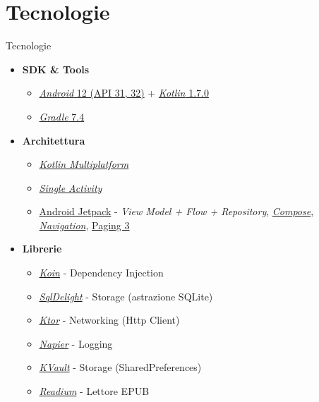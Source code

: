 \documentclass[10pt]{beamer}
\begin{document}
\section{Tecnologie}
\begin{frame}{Tecnologie}
    \begin{itemize}
    \item \textbf{SDK \& Tools}
    \begin{itemize}
        \item \href{https://developer.android.com/about/versions/12}{\textit{Android} 12 (API 31, 32)} + \href{https://github.com/JetBrains/kotlin/releases/tag/v1.7.0}{\textit{Kotlin} 1.7.0}
        \item \href{https://docs.gradle.org/7.4/userguide/userguide.html}{\textit{Gradle} 7.4}
    \end{itemize}
    \item \textbf{Architettura}
    \begin{itemize}
        \item \href{https://kotlinlang.org/lp/mobile/}{\textit{Kotlin Multiplatform}}
        \item \href{https://developer.android.com/guide/navigation/navigation-migrate}{\textit{Single Activity}}
        \item \href{https://developer.android.com/jetpack}{Android Jetpack} - \textit{View Model + Flow +  Repository}, \href{https://developer.android.com/jetpack/compose}{\textit{Compose}}, \href{https://developer.android.com/guide/navigation}{\textit{Navigation}}, \href{https://developer.android.com/topic/libraries/architecture/paging/v3-overview}{Paging 3}
    \end{itemize}
    \item \textbf{Librerie}
    \begin{itemize}
         \item \href{https://insert-koin.io/}{\textit{Koin}} - Dependency Injection
         \item \href{https://cashapp.github.io/sqldelight/}{\textit{SqlDelight}} - Storage (astrazione SQLite)
         \item \href{https://ktor.io/}{\textit{Ktor}} - Networking (Http Client)
         \item \href{https://github.com/AAkira/Napier}{\textit{Napier}} - Logging
         \item \href{https://github.com/Liftric/KVault}{\textit{KVault}} - Storage (SharedPreferences)
         \item \href{https://readium.org/}{\textit{Readium}} - Lettore EPUB
    \end{itemize}
     \end{itemize}
\end{frame}
\end{document}
